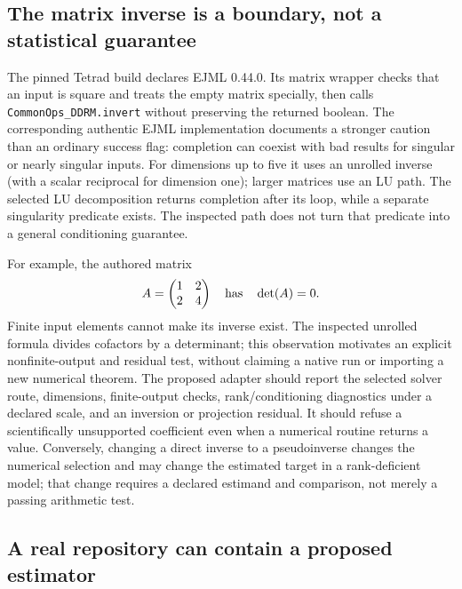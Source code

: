 \subsection{The matrix inverse is a boundary, not a statistical guarantee}

The pinned Tetrad build declares EJML 0.44.0. Its matrix wrapper checks that an input is square and treats the empty matrix specially, then calls \texttt{CommonOps\_DDRM.invert} without preserving the returned boolean. The corresponding authentic EJML implementation documents a stronger caution than an ordinary success flag: completion can coexist with bad results for singular or nearly singular inputs. For dimensions up to five it uses an unrolled inverse (with a scalar reciprocal for dimension one); larger matrices use an LU path. The selected LU decomposition returns completion after its loop, while a separate singularity predicate exists. The inspected path does not turn that predicate into a general conditioning guarantee.\citep{exec25_javaiv_tetrad,exec25_javaiv_ejml}

For example, the authored matrix
\[
 A=\begin{pmatrix}1&2\\2&4\end{pmatrix}
 \quad\hbox{has}\quad \det(A)=0.
\]
Finite input elements cannot make its inverse exist. The inspected unrolled formula divides cofactors by a determinant; this observation motivates an explicit nonfinite-output and residual test, without claiming a native run or importing a new numerical theorem. The proposed adapter should report the selected solver route, dimensions, finite-output checks, rank/conditioning diagnostics under a declared scale, and an inversion or projection residual. It should refuse a scientifically unsupported coefficient even when a numerical routine returns a value. Conversely, changing a direct inverse to a pseudoinverse changes the numerical selection and may change the estimated target in a rank-deficient model; that change requires a declared estimand and comparison, not merely a passing arithmetic test.\citep{exec25_javaiv_ejml,exec25_javaiv_choice}

\subsection{A real repository can contain a proposed estimator}

